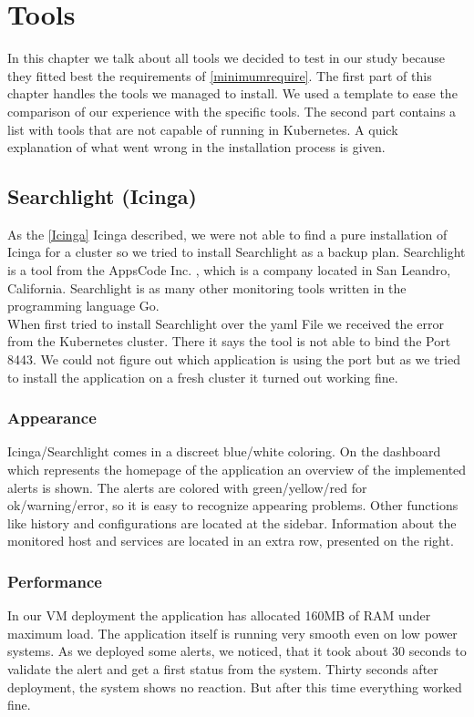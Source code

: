  
\chapter{Tools} 
In this chapter we talk about all tools we decided to test in our study because they fitted best the requirements of \cref{minimumrequire}. The first part of this chapter handles the tools we managed to install. We used a template to ease the comparison of our experience with the specific tools. The second part contains a list with tools that are not capable of running in Kubernetes. A quick explanation of what went wrong in the installation process is given.


\section{Searchlight (Icinga)}
\label{searchlight}
As the \cref{Icinga} Icinga described, we were not able to find a pure installation of Icinga for a cluster so we tried to install Searchlight as a backup plan.
Searchlight is a tool from the AppsCode Inc. \cite{appscode}, which is a company located in San Leandro, California. 
Searchlight is as many other monitoring tools written in the programming language Go.
\\
When first tried to install Searchlight over the yaml File we received the error from the Kubernetes cluster. There it says the tool is not able to bind the Port 8443. We could not figure out which application is using the port but as we tried to install the application on a fresh cluster it turned out working fine.
\subsection{Appearance}
Icinga/Searchlight comes in a  discreet blue/white coloring. On the dashboard which represents the homepage of the application an overview of the implemented alerts is shown. The alerts are colored with green/yellow/red for ok/warning/error, so it is easy to recognize appearing problems.
 Other functions like history and configurations are located at the sidebar. Information about the monitored host and services are located in an extra row, presented on the right.
\subsection{Performance}
In our VM deployment the application has allocated 160MB of RAM under maximum load. The application itself is running very smooth even on low power systems. As we deployed some alerts, we noticed, that it took about 30 seconds to validate the alert and get a first status from the system. Thirty seconds after deployment, the system shows no reaction. But after this time everything worked fine.
